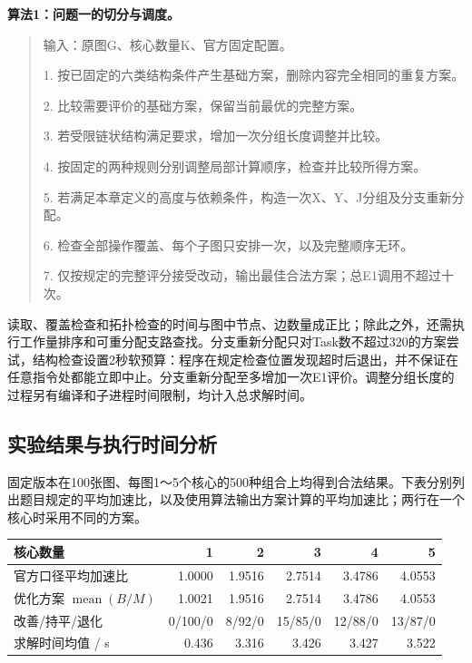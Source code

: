 \documentclass[anonymous,notoc]{gmcm2026}
\begin{document}
\textbf{算法1：问题一的切分与调度。}

\begin{quote}
输入：原图G、核心数量K、官方固定配置。

1. 按已固定的六类结构条件产生基础方案，删除内容完全相同的重复方案。

2. 比较需要评价的基础方案，保留当前最优的完整方案。

3. 若受限链状结构满足要求，增加一次分组长度调整并比较。

4. 按固定的两种规则分别调整局部计算顺序，检查并比较所得方案。

5. 若满足本章定义的高度与依赖条件，构造一次X、Y、J分组及分支重新分配。

6. 检查全部操作覆盖、每个子图只安排一次，以及完整顺序无环。

7. 仅按规定的完整评分接受改动，输出最佳合法方案；总E1调用不超过十次。
\end{quote}

读取、覆盖检查和拓扑检查的时间与图中节点、边数量成正比；除此之外，还需执行工作量排序和可重分配支路查找。分支重新分配只对Task数不超过320的方案尝试，结构检查设置2秒软预算：程序在规定检查位置发现超时后退出，并不保证在任意指令处都能立即中止。分支重新分配至多增加一次E1评价。调整分组长度的过程另有编译和子进程时间限制，均计入总求解时间。

\subsection{实验结果与执行时间分析}

固定版本在100张图、每图1～5个核心的500种组合上均得到合法结果。下表分别列出题目规定的平均加速比，以及使用算法输出方案计算的平均加速比；两行在一个核心时采用不同的方案。

\begin{table}[!htbp]\centering\small
\begin{tabularx}{\linewidth}{@{}Xrrrrr@{}}\toprule
核心数量 & 1 & 2 & 3 & 4 & 5 \\
\midrule
官方口径平均加速比 & 1.0000 & 1.9516 & 2.7514 & 3.4786 & 4.0553 \\
优化方案 $\operatorname{mean}(B/M)$ & 1.0021 & 1.9516 & 2.7514 & 3.4786 & 4.0553 \\
改善/持平/退化 & 0/100/0 & 8/92/0 & 15/85/0 & 12/88/0 & 13/87/0 \\
求解时间均值 / s & 0.436 & 3.316 & 3.426 & 3.427 & 3.522 \\
\bottomrule\end{tabularx}\end{table}
\end{document}
